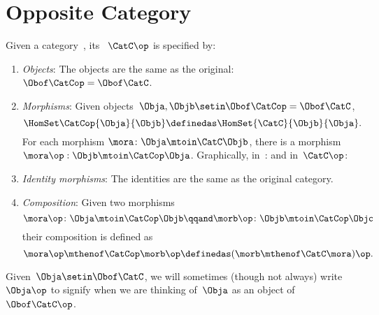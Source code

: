 
\section{Opposite Category}

\begin{ctdefinition}
    \label{def:opposite-category}
    \label{def:oppositecat}
    Given a category~\CatC, its \emph{}~$\CatC\op$ is specified by:
    \begin{enumerate}
        \item \emph{Objects}: The objects are the same as the original: $\Obof\CatCop = \Obof\CatC$.

        \item \emph{Morphisms}: Given objects~$\Obja,  \Objb \setin \Obof\CatCop = \Obof\CatC$,
              \begin{equation}
                  \label{eq:homset-op-cat}
                  \HomSet\CatCop{\Obja}{\Objb} \definedas \HomSet{\CatC}{\Objb}{\Obja}.
              \end{equation}
              For each morphism $\mora\colon\Obja\mtoin\CatC\Objb$, there is a morphism
              $\mora\op:\Objb\mtoin\CatCop\Obja$.
              Graphically, in~\CatC:
              and in~$\CatC\op$:
        \item \emph{Identity morphisms}: The identities are the same as the original category.
        \item \emph{Composition}: Given two morphisms
              \begin{equation}
                  \mora\op\colon \Obja \mtoin\CatCop \Objb
                  \qqand
                  \morb\op\colon \Objb \mtoin\CatCop \Objc
              \end{equation}
              their composition is defined as
              \begin{equation}
                  \mora\op \mthenof\CatCop \morb\op \definedas (\morb \mthenof\CatC \mora)\op.
              \end{equation}
    \end{enumerate}
\end{ctdefinition}
Given~$\Obja \setin  \Obof\CatC$, we will sometimes (though not always) write $\Obja\op$ to signify when we are thinking of~$\Obja$ as an object of~$\Obof\CatC\op$.

